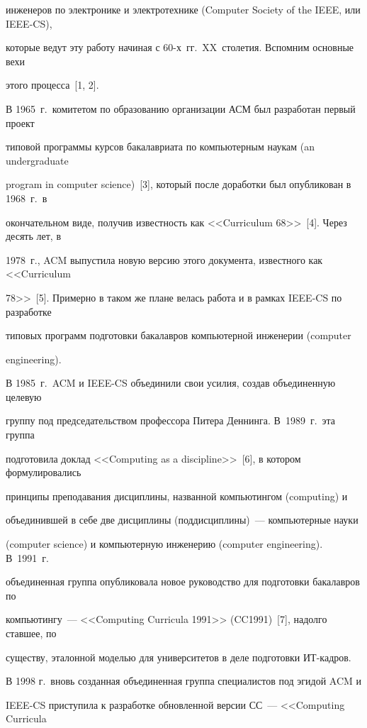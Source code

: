 инженеров по электронике и электротехнике (Computer Society of the IEEE, или IEEE-CS), 

которые ведут эту работу начиная с 60-х~гг.\ XX~столетия. Вспомним основные вехи 

этого процесса~[1, 2].



В 1965~г.\ комитетом по образованию организации АСМ был разработан первый проект 

типовой программы курсов бакалавриата по компьютерным наукам (an undergraduate 

program in computer science)~[3], который после доработки был опубликован в 1968~г.\ в 

окончательном виде, получив известность как <<Curriculum 68>>~[4]. Через десять лет, в 

1978~г., ACM выпустила новую версию этого документа, известного как <<Curriculum 

78>>~[5]. Примерно в таком же плане велась работа и в рамках IEEE-CS по разработке 

типовых программ подготовки бакалавров компьютерной инженерии (computer 

engineering). 



В 1985~г.\ ACM и IEEE-CS объединили свои усилия, создав объединенную целевую 

группу под председательством профессора Питера Деннинга. В~1989~г.\ эта группа 

подготовила доклад <<Computing as a discipline>>~[6], в котором формулировались 

принципы преподавания дисциплины, названной компьютингом (computing) и 

объединившей в себе две дисциплины (поддисциплины)~--- компьютерные науки 

(computer science) и компьютерную инженерию (computer engineering). В~1991~г.\ 

объединенная группа опубликовала новое руководство для подготовки бакалавров по 

компьютингу~--- <<Computing Curricula 1991>> (CC1991)~[7], надолго ставшее, по 

существу, эталонной моделью для университетов в деле подготовки ИТ-кадров.



В 1998 г.\ вновь созданная объединенная группа специалистов под эгидой ACM и 

IEEE-CS приступила к разработке обновленной версии СС~--- <<Computing Curricula 


